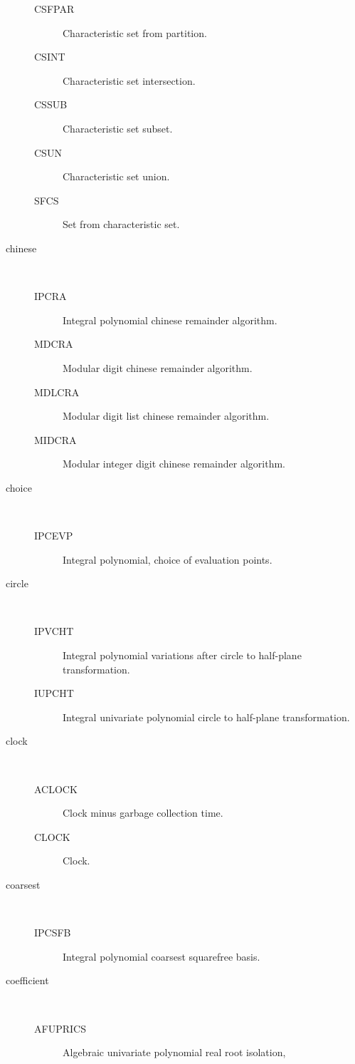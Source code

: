 \begin{description}
\begin{description}
  \item[CSFPAR]  Characteristic set from partition.
  \item[CSINT]  Characteristic set intersection.
  \item[CSSUB]  Characteristic set subset.
  \item[CSUN]  Characteristic set union.
  \item[SFCS]  Set from characteristic set.
  \end{description}
\item[chinese] \ \ 
  \begin{description}
  \item[IPCRA]  Integral polynomial chinese remainder algorithm.
  \item[MDCRA]  Modular digit chinese remainder algorithm.
  \item[MDLCRA]  Modular digit list chinese remainder algorithm.
  \item[MIDCRA]  Modular integer digit chinese remainder algorithm.
  \end{description}
\item[choice] \ \ 
  \begin{description}
  \item[IPCEVP]  Integral polynomial, choice of evaluation points.
  \end{description}
\item[circle] \ \ 
  \begin{description}
  \item[IPVCHT]  Integral polynomial variations after circle to half-plane
    transformation.
  \item[IUPCHT]  Integral univariate polynomial circle to half-plane
    transformation.
  \end{description}
\item[clock] \ \ 
  \begin{description}
  \item[ACLOCK]  Clock minus garbage collection time.
  \item[CLOCK]  Clock.
  \end{description}
\item[coarsest] \ \ 
  \begin{description}
  \item[IPCSFB]  Integral polynomial coarsest squarefree basis.
  \end{description}
\item[coefficient] \ \ 
  \begin{description}
  \item[AFUPRICS]  Algebraic univariate polynomial real root isolation,

\end{description}
\end{description}
